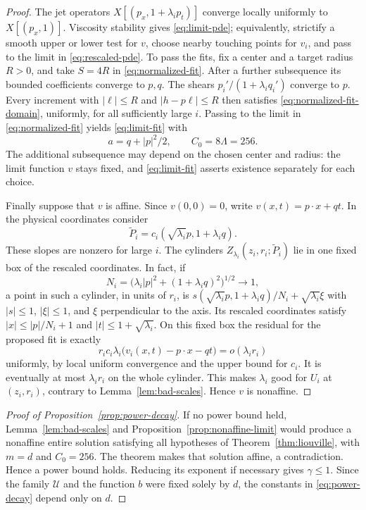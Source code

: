 \begin{proof}
The jet operators $X[(p_x,1+\lambda_i p_t)]$ converge locally uniformly to $X[(p_x,1)]$. Viscosity stability gives \eqref{eq:limit-pde}; equivalently, strictify a smooth upper or lower test for $v$, choose nearby touching points for $v_i$, and pass to the limit in \eqref{eq:rescaled-pde}. To pass the fits, fix a center and a target radius $R>0$, and take $S=4R$ in \eqref{eq:normalized-fit}. After a further subsequence its bounded coefficients converge to $p,q$. The shears $p_i'/(1+\lambda_i q_i')$ converge to $p$. Every increment with $|\ell|\le R$ and $|h-p\ell|\le R$ then satisfies \eqref{eq:normalized-fit-domain}, uniformly, for all sufficiently large $i$. Passing to the limit in \eqref{eq:normalized-fit} yields \eqref{eq:limit-fit} with
\[
  a=q+|p|^2/2,\qquad C_0=8\Lambda=256.
\]
The additional subsequence may depend on the chosen center and radius: the limit function $v$ stays fixed, and \eqref{eq:limit-fit} asserts existence separately for each choice.

Finally suppose that $v$ is affine. Since $v(0,0)=0$, write $v(x,t)=p\cdot x+qt$. In the physical coordinates consider
\[
  \widetilde P_i=c_i(\sqrt{\lambda_i}p,1+\lambda_i q).
\]
These slopes are nonzero for large $i$. The cylinders $Z_{\lambda_i}(z_i,r_i;\widetilde P_i)$ lie in one fixed box of the rescaled coordinates. In fact, if
\[
  N_i=\bigl(\lambda_i|p|^2+(1+\lambda_i q)^2\bigr)^{1/2}\longrightarrow1,
\]
a point in such a cylinder, in units of $r_i$, is $s(\sqrt{\lambda_i}p,1+\lambda_i q)/N_i+\sqrt{\lambda_i}\xi$ with $|s|\le1$, $|\xi|\le1$, and $\xi$ perpendicular to the axis. Its rescaled coordinates satisfy $|x|\le |p|/N_i+1$ and $|t|\le1+\sqrt{\lambda_i}$. On this fixed box the residual for the proposed fit is exactly
\[
  r_i c_i\lambda_i\bigl(v_i(x,t)-p\cdot x-qt\bigr)=o(\lambda_i r_i)
\]
uniformly, by local uniform convergence and the upper bound for $c_i$. It is eventually at most $\lambda_i r_i$ on the whole cylinder. This makes $\lambda_i$ good for $U_i$ at $(z_i,r_i)$, contrary to Lemma~\ref{lem:bad-scales}. Hence $v$ is nonaffine.
\end{proof}

\begin{proof}[Proof of Proposition~\ref{prop:power-decay}]
If no power bound held, Lemma~\ref{lem:bad-scales} and Proposition~\ref{prop:nonaffine-limit} would produce a nonaffine entire solution satisfying all hypotheses of Theorem~\ref{thm:liouville}, with $m=d$ and $C_0=256$. The theorem makes that solution affine, a contradiction. Hence a power bound holds. Reducing its exponent if necessary gives $\gamma\le1$. Since the family $\mathcal U$ and the function $b$ were fixed solely by $d$, the constants in \eqref{eq:power-decay} depend only on $d$.
\end{proof}

